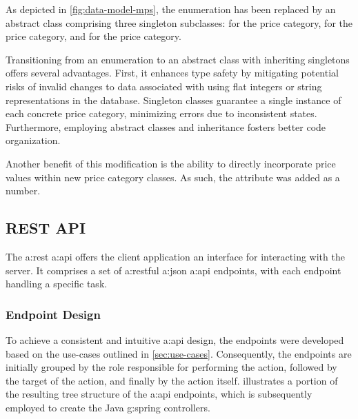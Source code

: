 As depicted in \cref{fig:data-model-mps}, the  enumeration has been replaced by an abstract class comprising three singleton subclasses:  for the  price category,  for the  price category, and  for the  price category.

Transitioning from an enumeration to an abstract class with inheriting singletons offers several advantages. First, it enhances type safety by mitigating potential risks of invalid changes to data associated with using flat integers or string representations in the database. Singleton classes guarantee a single instance of each concrete price category, minimizing errors due to inconsistent states. Furthermore, employing abstract classes and inheritance fosters better code organization.

Another benefit of this modification is the ability to directly incorporate price values within new price category classes. As such, the  attribute was added as a  number.

\pagebreak

\subsection{REST API}\label{sec:cs-api}

The \gls{a:rest} \gls{a:api} offers the client application an interface for interacting with the server. It comprises a set of \gls{a:rest}ful \gls{a:json} \gls{a:api} endpoints, with each endpoint handling a specific task.

\subsubsection{Endpoint Design}\label{sec:cs-api-endpoints}

To achieve a consistent and intuitive \gls{a:api} design, the endpoints were developed based on the use-cases outlined in \cref{sec:use-cases}. Consequently, the endpoints are initially grouped by the role responsible for performing the action, followed by the target of the action, and finally by the action itself.  illustrates a portion of the resulting tree structure of the \gls{a:api} endpoints, which is subsequently employed to create the Java \gls{g:spring} controllers.

